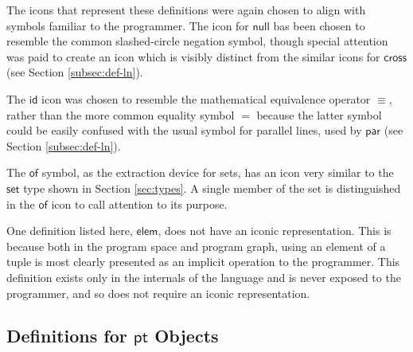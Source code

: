 \documentclass[twoside,openright,11pt]{report}
\begin{document}
The icons that represent these definitions were again chosen to align with symbols familiar to the programmer.
The icon for $\mathsf{null}$ bas been chosen to resemble the common slashed-circle negation symbol, though special attention was paid to create an icon which is visibly distinct from the similar icons for $\mathsf{cross}$ (see Section \ref{subsec:def-ln}).

The $\mathsf{id}$ icon was chosen to resemble the mathematical equivalence operator $\equiv$, rather than the more common equality symbol $=$ because the latter symbol could be easily confused with the usual symbol for parallel lines, used by $\mathsf{par}$ (see Section \ref{subsec:def-ln}).

The $\mathsf{of}$ symbol, as the extraction device for sets, has an icon very similar to the $\mathsf{set}$ type shown in Section \ref{sec:types}.
A single member of the set is distinguished in the $\mathsf{of}$ icon to call attention to its purpose.

One definition listed here, $\mathsf{elem}$, does not have an iconic representation. 
This is because both in the program space and program graph, using an element of a tuple is most clearly presented as an implicit operation to the programmer. 
This definition exists only in the internals of the language and is never exposed to the programmer, and so does not require an iconic representation. 

\subsection{Definitions for $\mathsf{pt}$ Objects}
\label{subsec:def-pt}
\end{document}

